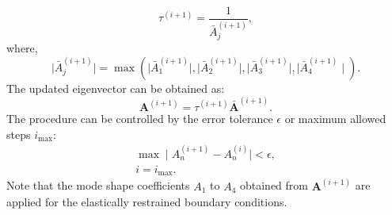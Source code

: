\documentclass[preprint,12pt]{elsarticle}
\begin{document}
%
\begin{equation}\label{eq:Newgeigenvalue}
	\tau^{(i+1)} = \frac{1}{\bar{A}_j^{(i+1)}},
\end{equation}
%
where,
%
\begin{equation}\label{eq:updatetau}
	\mid \bar{A}_j^{(i+1)} \mid = \max(\mid \bar{A}_1^{(i+1)} \mid, \mid \bar{A}_2^{(i+1)} \mid, \mid\bar{A}_3^{(i+1)}\mid , \mid \bar{A}_4^{(i+1)} \mid).
\end{equation}
%
The updated eigenvector can be obtained as:
%
\begin{equation}\label{eq:updateeigenvalue}
	\mathbf{A}^{(i+1)} = \tau^{(i+1)} \bar{\mathbf{A}}^{(i+1)}.
\end{equation}
%
The procedure can be controlled by the error tolerance \( \epsilon \) or maximum allowed steps \( i_{\text{max}} \):
%
\begin{subequations}
	\begin{align}
		\max \mid A_n^{(i+1)} - A_n^{(i)} \mid < \epsilon, \\ 
		i = i_{\text{max}}.
	\end{align}
\end{subequations}
%
Note that the mode shape coefficients \( A_1 \) to \( A_4 \) obtained from \(\mathbf{A}^{(i+1)}\) are applied for the elastically restrained boundary conditions.
\end{document}
